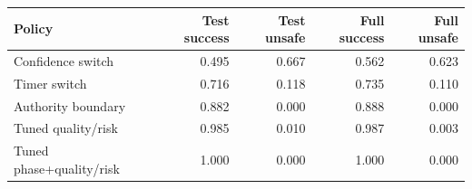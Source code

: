 \begin{tabular}{lrrrr}
\toprule
Policy & Test success & Test unsafe & Full success & Full unsafe \\
\midrule
Confidence switch & 0.495 & 0.667 & 0.562 & 0.623 \\
Timer switch & 0.716 & 0.118 & 0.735 & 0.110 \\
Authority boundary & 0.882 & 0.000 & 0.888 & 0.000 \\
Tuned quality/risk & 0.985 & 0.010 & 0.987 & 0.003 \\
Tuned phase+quality/risk & 1.000 & 0.000 & 1.000 & 0.000 \\
\bottomrule
\end{tabular}
